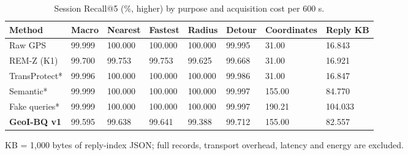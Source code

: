 \begin{table}[t]\centering\footnotesize
\caption{Session Recall@5 (\%, higher) by purpose and acquisition cost per 600 s.}\label{tab:service}
\begin{tabularx}{\linewidth}{@{}P{2.7cm}YYYYYYY@{}}\toprule
\textbf{Method} & \textbf{Macro} & \textbf{Nearest} & \textbf{Fastest} & \textbf{Radius} & \textbf{Detour} & \textbf{Coordinates} & \textbf{Reply KB} \\
\midrule
Raw GPS & 99.999 & 100.000 & 100.000 & 100.000 & 99.995 & 31.00 & 16.843 \\
REM-Z (K1) & 99.700 & 99.753 & 99.753 & 99.625 & 99.668 & 31.00 & 16.921 \\
TransProtect* & 99.996 & 100.000 & 100.000 & 100.000 & 99.986 & 31.00 & 16.847 \\
Semantic* & 99.999 & 100.000 & 100.000 & 100.000 & 99.997 & 155.00 & 84.770 \\
Fake queries* & 99.999 & 100.000 & 100.000 & 100.000 & 99.997 & 190.21 & 104.033 \\
\textbf{GeoI-BQ v1} & 99.595 & 99.638 & 99.641 & 99.388 & 99.712 & 155.00 & 82.557 \\
\bottomrule\end{tabularx}
\par\smallskip\raggedright KB = 1,000 bytes of reply-index JSON; full records, transport overhead, latency and energy are excluded.
\end{table}
